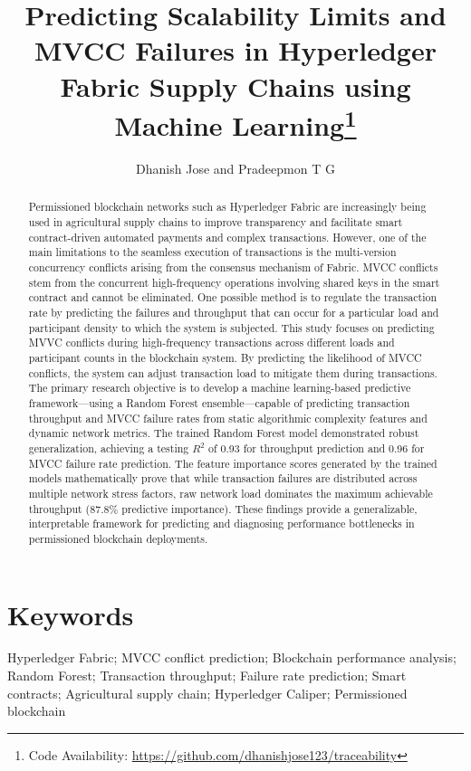 \documentclass[12pt]{article}
\title{Predicting Scalability Limits and MVCC Failures in Hyperledger Fabric Supply Chains using Machine Learning\thanks{Code Availability: \url{https://github.com/dhanishjose123/traceability}}}
\author{Dhanish Jose and Pradeepmon T G}
\affil{Department of Mechanical Engineering, National Institute of Technology Calicut, India}
\date{}
\begin{document}
	
	\maketitle
		\begin{abstract}
	Permissioned blockchain networks such as Hyperledger Fabric are increasingly being used in agricultural supply chains to improve transparency and facilitate smart contract-driven automated payments and complex transactions. However, one of the main limitations to the seamless execution of transactions is the multi-version concurrency conflicts arising from the consensus mechanism of Fabric. MVCC conflicts stem from the concurrent high-frequency operations involving shared keys in the smart contract and cannot be eliminated. One possible method is to regulate the transaction rate by predicting the failures and throughput that can occur for a particular load and participant density to which the system is subjected. This study focuses on predicting MVVC conflicts during high-frequency transactions across different loads and participant counts in the blockchain system. By predicting the likelihood of MVCC conflicts, the system can adjust transaction load to mitigate them during transactions. The primary research objective is to develop a machine learning-based predictive framework—using a Random Forest ensemble—capable of predicting transaction throughput and MVCC failure rates from static algorithmic complexity features and dynamic network metrics. The trained Random Forest model demonstrated robust generalization, achieving a testing $R^2$ of 0.93 for throughput prediction and 0.96 for MVCC failure rate prediction. The feature importance scores generated by the trained models mathematically prove that while transaction failures are distributed across multiple network stress factors, raw network load dominates the maximum achievable throughput (87.8\% predictive importance). These findings provide a generalizable, interpretable framework for predicting and diagnosing performance bottlenecks in permissioned blockchain deployments.
	\end{abstract}
	
	
	
	
	
	\section*{Keywords}
	Hyperledger Fabric; MVCC conflict prediction; Blockchain performance analysis; 
	Random Forest; Transaction throughput; Failure rate prediction; Smart contracts; 
	Agricultural supply chain; Hyperledger Caliper; Permissioned blockchain
	
\end{document}
